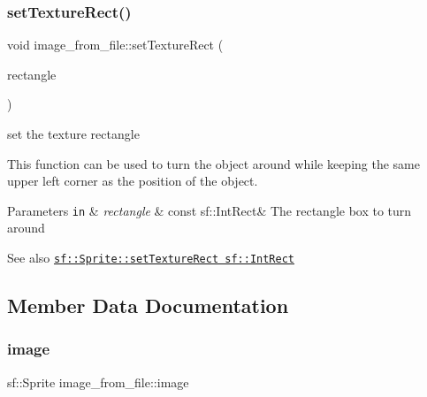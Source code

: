 \subsubsection{\texorpdfstring{set\+Texture\+Rect()}{setTextureRect()}}
{\footnotesize\ttfamily void image\+\_\+from\+\_\+file\+::set\+Texture\+Rect (\begin{DoxyParamCaption}\item[{const sf\+::\+Int\+Rect \&}]{rectangle }\end{DoxyParamCaption})}



set the texture rectangle 

This function can be used to turn the object around while keeping the same upper left corner as the position of the object.


\begin{DoxyParams}[1]{Parameters}
\mbox{\tt in}  & {\em rectangle} & const sf\+::\+Int\+Rect\& The rectangle box to turn around \\
\hline
\end{DoxyParams}
\begin{DoxySeeAlso}{See also}
\href{https://www.sfml-dev.org/documentation/2.0/classsf_1_1Sprite.php#a3fefec419a4e6a90c0fd54c793d82ec2 }{\tt sf\+::\+Sprite\+::set\+Texture\+Rect sf\+::\+Int\+Rect} 
\end{DoxySeeAlso}


\subsection{Member Data Documentation}
\mbox{\label{classimage__from__file_a3c284697aa8a74be146dbe6429c2e66d}} 
\subsubsection{\texorpdfstring{image}{image}}
{\footnotesize\ttfamily sf\+::\+Sprite image\+\_\+from\+\_\+file\+::image\hspace{0.3cm}{\ttfamily [private]}}

\mbox{\label{classimage__from__file_a236ad235d4ef465070466a1c2f524a8e}} 

